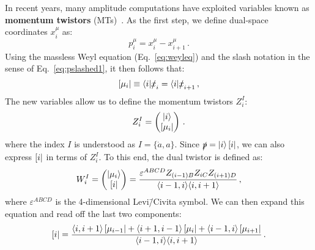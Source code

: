\documentclass[main.tex]{subfiles}
\begin{document}
In recent years, many amplitude computations have exploited variables known as \textbf{momentum twistors} (MTs)~\cite{Hodges:2009hk, Badger:2013gxa, Badger:2016uuq}. As the first step, we define dual-space coordinates $x_i^\mu$ as:
\begin{equation} \label{eq:dualspacedef}
    p_i^\mu = x_i^\mu - x_{i+1}^\mu\,.
\end{equation}
Using the massless Weyl equation (Eq.~\ref{eq:weyleq}) and the slash notation in the sense of Eq.~\ref{eq:pslashed1}, it then follows that:
\begin{equation} \label{eq:incidencerel}
    \left[ \mu_i \right| \equiv \langle i|\slashed{x}_i = \langle i|\slashed{x}_{i+1}\,,
\end{equation}
The new variables allow us to define the momentum twistors $Z_i^I$:
\begin{equation} \label{eq:momtwistor}
    Z_i^I = 
    \begin{pmatrix}
        |i \rangle \\
        \left[ \mu_i \right| 
    \end{pmatrix}\,.
\end{equation}
where the index $I$ is understood as $I=\{\dot{a},a\}$. Since $\slashed{p} = |i \rangle\left[ i \right|$, we can also express $\left[ i \right|$ in terms of $Z_i^I$. To this end, the dual twistor is defined as:
\begin{equation} \label{eq:dualmomtwistor}
    W_i^I = 
    \begin{pmatrix}
        |\mu_i \rangle \\
        \left[ i \right|
    \end{pmatrix} = 
    \frac{\varepsilon^{ABCD} Z_{(i-1)B} Z_{iC} Z_{(i+1)D}}{\langle i-1, i \rangle \langle i, i+1 \rangle}\,,
\end{equation}
where $\varepsilon^{ABCD}$ is the 4-dimensional Levi\=/Civita symbol. We can then expand this equation and read off the last two components:
\begin{equation}
    \left[ i \right| = \frac{\langle i, i+1 \rangle\left[ \mu_{i-1} \right| + \langle i+1, i-1 \rangle\left[ \mu_i \right| + \langle i-1, i \rangle\left[ \mu_{i+1} \right| }{\langle i-1, i \rangle\langle i, i+1 \rangle}\,.
\end{equation}
\end{document}
